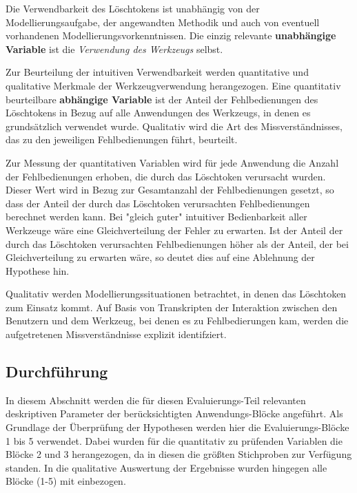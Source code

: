 Die Verwendbarkeit des Löschtokens ist unabhängig von der Modellierungsaufgabe, der angewandten Methodik und auch von eventuell vorhandenen Modellierungsvorkenntnissen. Die einzig relevante \textbf{unabhängige Variable} ist die \emph{Verwendung des Werkzeugs} selbst. 

Zur Beurteilung der intuitiven Verwendbarkeit werden quantitative und qualitative Merkmale der Werkzeugverwendung herangezogen. Eine quantitativ beurteilbare \textbf{abhängige Variable} ist der Anteil der Fehlbedienungen des Löschtokens in Bezug auf alle Anwendungen des Werkzeugs, in denen es grundsätzlich verwendet wurde. Qualitativ wird die Art des Missverständnisses, das zu den jeweiligen Fehlbedienungen führt, beurteilt.

Zur Messung der quantitativen Variablen wird für jede Anwendung die Anzahl der Fehlbedienungen erhoben, die durch das Löschtoken verursacht wurden. Dieser Wert wird in Bezug zur Gesamtanzahl der Fehlbedienungen gesetzt, so dass der Anteil der durch das Löschtoken verursachten Fehlbedienungen berechnet werden kann. Bei "gleich guter" intuitiver Bedienbarkeit aller Werkzeuge wäre eine Gleichverteilung der Fehler zu erwarten. Ist der Anteil der durch das Löschtoken verursachten Fehlbedienungen höher als der Anteil, der bei Gleichverteilung zu erwarten wäre, so deutet dies auf eine Ablehnung der Hypothese hin.

Qualitativ werden Modellierungssituationen betrachtet, in denen das Löschtoken zum Einsatz kommt. Auf Basis von Transkripten der Interaktion zwischen den Benutzern und dem Werkzeug, bei denen es zu Fehlbedierungen kam, werden die aufgetretenen Missverständnisse explizit identifziert.



\subsection{Durchführung} %
\label{sub:durchführung}

In diesem Abschnitt werden die für diesen Evaluierungs-Teil relevanten deskriptiven Parameter der berücksichtigten Anwendungs-Blöcke angeführt.
Als Grundlage der Überprüfung der Hypothesen werden hier die Evaluierungs-Blöcke 1 bis 5 verwendet. Dabei wurden für die quantitativ zu prüfenden Variablen die Blöcke 2 und 3 herangezogen, da in diesen die größten Stichproben zur Verfügung standen. In die qualitative Auswertung der Ergebnisse wurden hingegen alle Blöcke (1-5) mit einbezogen.

